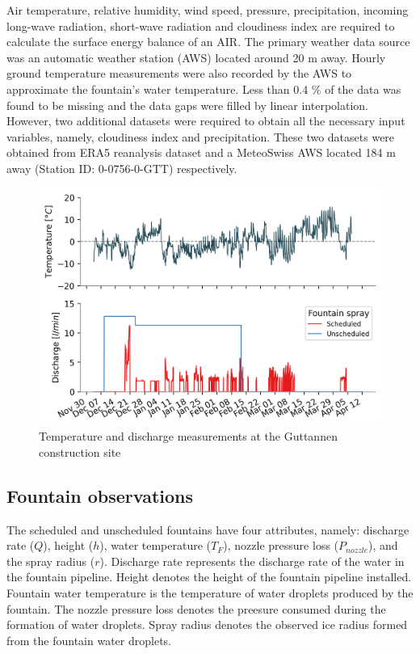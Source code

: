 \documentclass[tc, manuscript]{copernicus}
\begin{document}
Air temperature, relative humidity, wind speed, pressure, precipitation, incoming long-wave radiation,
short-wave radiation and cloudiness index are required to calculate the surface energy balance of an AIR. The
primary weather data source was an automatic weather station (AWS) located around 20 m away. Hourly ground
temperature measurements were also recorded by the AWS to approximate the fountain's water temperature. Less
than 0.4 \% of the data was found to be missing and the data gaps were filled by linear interpolation. However,
two additional datasets were required to obtain all the necessary input variables, namely, cloudiness index and
precipitation. These two datasets were obtained from ERA5 reanalysis dataset
\citep{hersbachERA5GlobalReanalysis2020} and a MeteoSwiss AWS located 184 m away (Station ID: 0-0756-0-GTT)
respectively.

\begin{figure}[t]
\includegraphics[width=12cm]{Figures/disvstemp.png}
\caption{Temperature and discharge measurements at the Guttannen construction site}
\label{fig:aws} 
\end{figure}

\subsection{Fountain observations}

The scheduled and unscheduled fountains have four attributes, namely: discharge rate ($Q$), height ($h$), water
temperature ($T_F$), nozzle pressure loss ($P_{nozzle}$), and the spray radius ($r$). Discharge rate represents
the discharge rate of the water in the fountain pipeline. Height denotes the height of the fountain pipeline
installed. Fountain water temperature is the temperature of water droplets produced by the fountain. The nozzle
pressure loss denotes the preesure consumed during the formation of water droplets. Spray radius denotes the
observed ice radius formed from the fountain water droplets.
\end{document}
